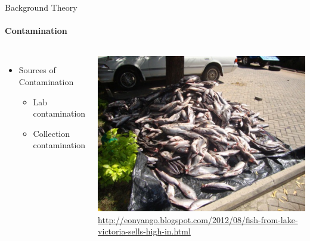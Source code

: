 \documentclass[letter,graphicx]{beamer}
\def\Tiny{\fontsize{3pt}{3pt} \selectfont}
\begin{document}
\begin{frame}{Background Theory}
\framesubtitle{Contamination}
\begin{columns}[c]

\column{2.5in}
\begin{itemize}
\item Sources of Contamination
\vspace{2mm}
    \begin{itemize}
	\item Lab contamination
	\vspace{5mm}
	\item Collection contamination
   \end{itemize}
\end{itemize}
\vspace{6mm}
\centering \includegraphics[width=.6\textwidth]{images/heap_fish} \\
\Tiny \url{http://eonyango.blogspot.com/2012/08/fish-from-lake-victoria-sells-high-in.html}


\end{columns}
\end{frame}
\end{document}
